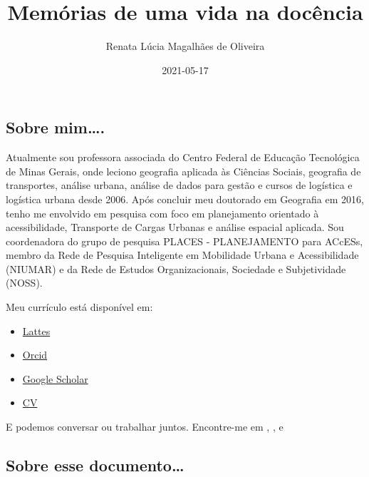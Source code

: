 \documentclass[
]{book}
\title{Memórias de uma vida na docência}
\author{Renata Lúcia Magalhães de Oliveira}
\date{2021-05-17}
\providecommand{\tightlist}{%
  \setlength{\itemsep}{0pt}\setlength{\parskip}{0pt}}
\begin{document}
\frontmatter
\maketitle

\mainmatter
\hypertarget{section}{%
\chapter*{}\label{section}}

\hypertarget{sobre-mim.}{%
\section*{Sobre mim\ldots.}\label{sobre-mim.}}

Atualmente sou professora associada do Centro Federal de Educação
Tecnológica de Minas Gerais, onde leciono geografia aplicada às Ciências
Sociais, geografia de transportes, análise urbana, análise de dados para
gestão e cursos de logística e logística urbana desde 2006. Após
concluir meu doutorado em Geografia em 2016, tenho me envolvido em
pesquisa com foco em planejamento orientado à acessibilidade, Transporte
de Cargas Urbanas e análise espacial aplicada. Sou coordenadora do grupo
de pesquisa PLACES - PLANEJAMENTO para ACcESs, membro da Rede de
Pesquisa Inteligente em Mobilidade Urbana e Acessibilidade (NIUMAR) e da
Rede de Estudos Organizacionais, Sociedade e Subjetividade (NOSS).

Meu currículo está disponível em:

\begin{itemize}
\tightlist
\item
  \href{http://lattes.cnpq.br/2642488704355833}{Lattes}
\item
  \href{https://orcid.org/0000-0002-9011-2342}{Orcid}
\item
  \href{https://scholar.google.com/citations?user=V6EX45EAAAAJ}{Google
  Scholar}
\item
  \href{https://github.com/retaoliveira/relements/raw/main/texto/index.pdf}{CV}
\end{itemize}

E podemos conversar ou trabalhar juntos. Encontre-me em , , e

\hypertarget{sobre-esse-documento}{%
\section*{Sobre esse documento\ldots{}}\label{sobre-esse-documento}}
\end{document}
